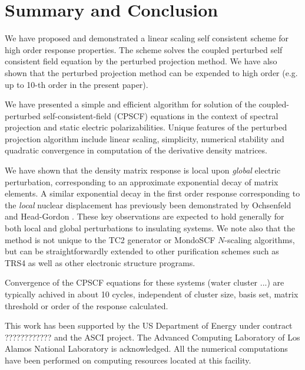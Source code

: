 \documentclass[prl,aps,twocolumn,showpacs,twocolumngrid,superbib]{revtex4}
\begin{document}
\section{Summary and Conclusion}


 We have proposed and demonstrated a linear scaling self
 consistent scheme for high order response properties.
 The scheme solves the coupled perturbed self consistent field 
 equation by the perturbed projection method. We have also shown
 that the perturbed projection method can be expended to high
 order (e.g. up to 10-th order in the present paper).

We have presented a simple and efficient algorithm for solution 
of the coupled-perturbed self-consistent-field (CPSCF) equations 
in the context of spectral projection and static
electric polarizabilities. Unique features of the perturbed 
projection algorithm include linear scaling, simplicity, numerical 
stability and quadratic convergence in computation of the derivative
density matrices.

We have shown that the density matrix response is local 
upon {\em global} electric perturbation, corresponding to an approximate 
exponential decay of matrix elements. A similar exponential decay
in the first order response corresponding to the {\em local} nuclear 
displacement has previously been demonstrated by Ochsenfeld and 
Head-Gordon \cite{Ochsenfeld_1997}. These key observations are expected to
hold generally for both local and global perturbations to insulating systems.  
We note also that the method is not unique to the TC2 generator or 
{\sc MondoSCF} $N$-scaling algorithms, but can be straightforwardly 
extended to other purification schemes such as TRS4 \cite{ANiklasson03} as
well as other electronic structure programs.

Convergence of the CPSCF equations for these systems (water cluster ...)
are typically achived in about 10 cycles, independent of cluster size, basis set,
matrix threshold or order of the response calculated.

\begin{acknowledgments}
 This work has been supported by the US Department of Energy 
 under contract ???????????? and the ASCI project.  
 The Advanced Computing Laboratory of Los 
 Alamos National Laboratory is acknowledged.
 All the numerical computations have been
 performed on computing resources located at this facility.
\end{acknowledgments}

\end{document}
